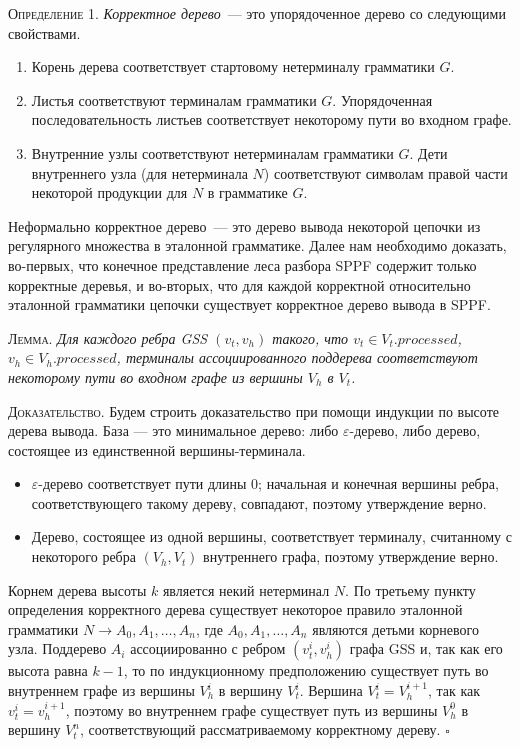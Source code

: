 \textsc{Определение 1.} 
\emph{Корректное дерево}~--- это упорядоченное дерево со следующими свойствами.
\begin{enumerate}
  \item Корень дерева соответствует стартовому нетерминалу грамматики $G$.
  \item Листья соответствуют терминалам грамматики $G$. Упорядоченная последовательность листьев соответствует некоторому пути во входном графе.
  \item Внутренние узлы соответствуют нетерминалам грамматики $G$. Дети внутреннего узла (для нетерминала $N$) соответствуют символам правой части некоторой продукции для $N$ в грамматике $G$.
\end{enumerate}

Неформально корректное дерево~--- это дерево вывода некоторой цепочки из регулярного множества в эталонной грамматике. Далее нам необходимо доказать, во-первых, что конечное представление леса разбора SPPF содержит только корректные деревья, и во-вторых, что для каждой корректной относительно эталонной грамматики цепочки существует корректное дерево вывода в SPPF. 

\textsc{Лемма.}
\textit{Для каждого ребра GSS $(v_{t}, v_{h})$ такого, что $v_{t} \in V_{t}.processed$, $v_{h} \in 
V_{h}.processed$, терминалы ассоциированного поддерева соответствуют некоторому пути во входном графе из вершины $V_{h}$ в $V_{t}$.}

\textsc{Доказательство.}
Будем строить доказательство при помощи индукции по высоте дерева вывода. База --- это минимальное дерево: либо $\varepsilon$-дерево, либо дерево, состоящее из единственной вершины-терминала. 
\begin{itemize}
    \item $\varepsilon$-дерево соответствует пути длины $0$; начальная и конечная вершины ребра, соответствующего такому дереву, совпадают, поэтому утверждение верно. 
    \item Дерево, состоящее из одной вершины, соответствует терминалу, считанному с некоторого ребра $(V_{h}, V_{t})$ внутреннего графа, поэтому утверждение верно.
\end{itemize}

Корнем дерева высоты $k$ является некий нетерминал $N$. По третьему пункту определения корректного дерева существует некоторое правило эталонной грамматики $N \rightarrow A_{0}, A_{1}, \dots, A_{n}$, где $A_{0}, A_{1}, \dots, A_{n}$ являются детьми корневого узла. Поддерево $A_{i}$ ассоциированно с ребром $(v_{t}^{i}, v_{h}^{i})$ графа GSS и, так как его высота равна $k-1$, то по индукционному предположению существует путь во внутреннем графе из вершины $V_{h}^{i}$ в вершину $V_{t}^{i}$. Вершина $V_{t}^{i} = V_{h}^{i+1}$, так как $v_{t}^{i} = v_{h}^{i+1}$, поэтому во внутреннем графе существует путь из вершины $V_{h}^{0}$ в вершину $V_{t}^{n}$, соответствующий рассматриваемому корректному дереву. $\square$

